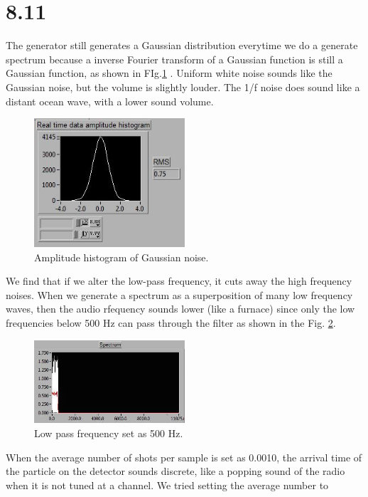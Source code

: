 \documentclass[authoryear, 12pt,5p, times]{elsarticle}
\begin{document}
  \section*{8.11}
The generator still generates a Gaussian distribution everytime we do a generate spectrum because a inverse Fourier transform of a Gaussian function is still a Gaussian function, as shown in FIg.\ref{gaussian} . Uniform white noise sounds like the Gaussian noise, but the volume is slightly louder.  The 1/f noise does sound like a distant ocean wave, with a lower sound volume.
\begin{figure}[h!]
 \centering
 \includegraphics[width=0.5\textwidth]{figure/generate_spectrum.jpg}
\caption{Amplitude histogram of Gaussian noise.}
\label{gaussian}
 \end{figure}
\par We find that if we alter the low-pass frequency, it cuts away the high frequency noises. When we generate a spectrum as a superposition of many low frequency waves, then the audio rfequency sounds lower (like a furnace) since only the low frequencies below 500 Hz can pass through the filter as shown in the Fig. \ref{furnace}.
\begin{figure}[h!]
 \centering
 \includegraphics[width=0.5\textwidth]{figure/furnace.jpg}
\caption{Low pass frequency set as 500 Hz.}
\label{furnace}
 \end{figure}
 \par When the average number of shots per sample is set as 0.0010, the arrival time of the particle on the detector sounds discrete, like a popping sound of the radio when it is not tuned at a channel. We tried setting the average number to 
\end{document}
